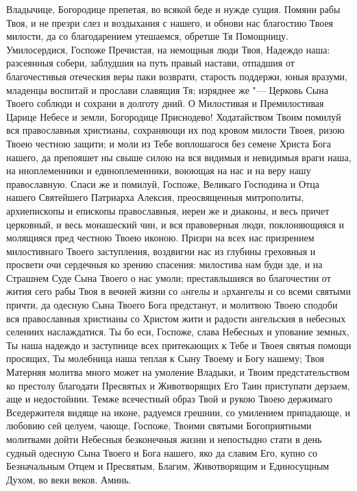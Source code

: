 Владычице, Богородице препетая, во всякой беде и нужде сущия. Помяни рабы Твоя, и не презри слез и воздыхания с нашего, и обнови нас благостию Твоея милости, да со благодарением утешаемся, обретше Тя Помощницу. Умилосердися, Госпоже Пречистая, на немощныя люди Твоя, Надеждо наша: разсеянныя собери, заблудшия на путь правый настави, отпадшия от благочестивыя отеческия веры паки возврати, старость поддержи, юныя вразуми, младенцы воспитай и прослави славящия Тя; изряднее же "--- Церковь Сына Твоего соблюди и сохрани в долготу дний. О Милостивая и Премилостивая Царице Небесе и земли, Богородице Приснодево! Ходатайством Твоим помилуй вся православныя христианы, сохраняющи их под кровом милости Твоея, ризою Твоею честною защити; и моли из Тебе воплошагося без семене Христа Бога нашего, да препояшет ны свыше силою на вся видимыя и невидимыя враги наша, на иноплеменники и единоплеменники, воюющая на нас и на веру нашу православную. Спаси же и помилуй, Госпоже, Великаго Господина и Отца нашего Святейшего Патриарха Алексия, преосвященныя митрополиты, архиепископы и епископы православныя, иереи же и диаконы, и весь причет церковный, и весь монашеский чин, и вся правоверныя люди, поклоняющияся и молящияся пред честною Твоею иконою. Призри на всех нас призрением милостивнаго Твоего заступления, воздвигни нас из глубины греховныя и просвети очи сердечныя ко зрению спасения: милостива нам буди зде, и на Страшнем Суде Сына Твоего о нас умоли; преставльшияся во благочестии от жития сего рабы Твоя в вечней жизни со aнгелы и aрхангелы и со всеми святыми причти, да одесную Сына Твоего Бога предстанут, и молитвою Твоею сподоби вся православныя христианы со Христом жити и радости ангельския в небесных селениих наслаждатися. Ты бо еси, Госпоже, слава Небесных и упование земных, Ты наша надеждо и заступнице всех притекающих к Тебе и Твоея святыя помощи просящих, Ты молебница наша теплая к Сыну Твоему и Богу нашему; Твоя Матерняя молитва много может на умоление Владыки, и Твоим предстательством ко престолу благодати Пресвятых и Животворящих Его Таин приступати дерзаем, аще и недостойнии. Темже всечестный образ Твой и рукою Твоею держимаго Вседержителя видяще на иконе, радуемся грешнии, со умилением припадающе, и любовию сей целуем, чающе, Госпоже, Твоими святыми Богоприятными молитвами дойти Небесныя безконечныя жизни и непостыдно стати в день судный одесную Сына Твоего и Бога нашего, яко да славим Его, купно со Безначальным Отцем и Пресвятым, Благим, Животворящим и Единосущным Духом, во веки веков. Аминь.
\mychapterending

 
